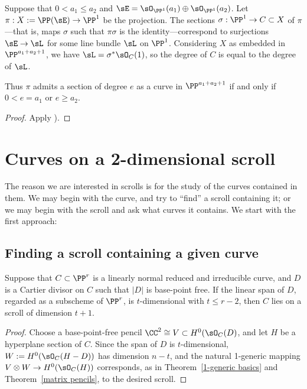 \begin{proposition} Suppose that $0<a_1\leq a_2$ and
$\sE = \sO_{\PP^1}(a_1)\oplus \sO_{\PP^1}(a_2)$. Let $\pi: X:= \PP(\sE) \to \PP^1$ be the projection.
The sections $\sigma:\PP^1 \to C\subset X$ of $\pi$---that is, maps $\sigma$ such that $\pi\sigma$ is the 
identity---correspond to surjections
$\sE \to \sL$ for some line bundle $\sL$ on $\PP^1$. Considering  $X$ as embedded in 
$\PP^{a_1+a_2+1}$, we have $\sL = \sigma^*\sO_C(1)$, so the degree of $C$ is equal
to the degree of $\sL$.

Thus $\pi$ admits a section of degree $e$ as a curve in $\PP^{a_1+a_2+1}$ if and only if
$0<e = a_1$ or $e\geq a_2$.
\end{proposition}

\begin{proof}
Apply \cite[II.7.12]{Hartshorne1977}).
\end{proof}



\section{Curves on a 2-dimensional scroll}\label{curves on scrolls}
The reason we are interested in scrolls is for the study of the curves contained in them.
We may begin with the curve, and try to ``find'' a scroll containing it; or we may begin with the scroll and ask
what curves it contains. We start with the first approach:

\subsection{Finding a scroll containing a given curve}

\begin{proposition}
Suppose that $C\subset \PP^r$ is a linearly normal reduced and irreducible curve, and $D$ is a  Cartier divisor on $C$ such that $|D|$ is base-point free. If the linear span of $D$, regarded as a subscheme of $\PP^{r}$, is $t$-dimensional with $t\leq r-2$, then $C$ lies on a scroll of dimension $t+1$.
\end{proposition}

\begin{proof}
Choose a base-point-free pencil $\CC^2\cong V \subset H^0(\sO_C(D)$, and let $H$ be a hyperplane section of $C$. Since the span of $D$ is $t$-dimensional, $W:=H^0(\sO_C(H-D))$ has dimension $n-t$, and the natural 1-generic mapping
$V\otimes W \to H^0(\sO_C(H))$ corresponds, as in Theorem~\ref{1-generic basics} and Theorem~\ref{matrix pencils}, to the desired scroll.
\end{proof}

